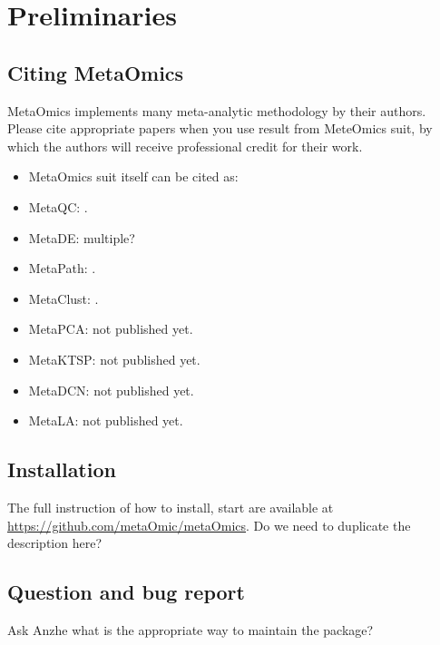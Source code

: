 \section{Preliminaries}
\subsection{Citing MetaOmics}
MetaOmics implements many meta-analytic methodology by their authors. 
Please cite appropriate papers when you use result from MeteOmics suit,
by which the authors will receive professional credit for their work.

\begin{itemize}
\item MetaOmics suit itself can be cited as:
\item MetaQC: .
\item MetaDE: {\color{red}multiple?}
\item MetaPath: .
\item MetaClust: .
\item MetaPCA: not published yet.
\item MetaKTSP: not published yet.
\item MetaDCN: not published yet.
\item MetaLA: not published yet.
\end{itemize}


\subsection{Installation}
The full instruction of how to install, start are available at \url{https://github.com/metaOmic/metaOmics}.
{
\color{red}
Do we need to duplicate the description here?
}

\subsection{Question and bug report}
{
\color{red}
Ask Anzhe what is the appropriate way to maintain the package?
}

 
